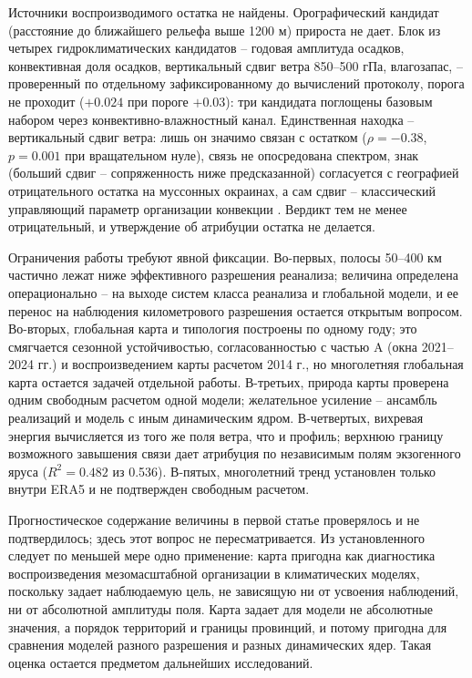 \documentclass[12pt,a4paper]{article}
\begin{document}
Источники воспроизводимого остатка не найдены. Орографический кандидат (расстояние до ближайшего рельефа выше 1200 м) прироста не дает. Блок из четырех гидроклиматических кандидатов -- годовая амплитуда осадков, конвективная доля осадков, вертикальный сдвиг ветра 850--500 гПа, влагозапас, -- проверенный по отдельному зафиксированному до вычислений протоколу, порога не проходит ($+0.024$ при пороге $+0.03$): три кандидата поглощены базовым набором через конвективно-влажностный канал. Единственная находка -- вертикальный сдвиг ветра: лишь он значимо связан с остатком ($\rho = -0.38$, $p = 0.001$ при вращательном нуле), связь не опосредована спектром, знак (больший сдвиг -- сопряженность ниже предсказанной) согласуется с географией отрицательного остатка на муссонных окраинах, а сам сдвиг -- классический управляющий параметр организации конвекции \cite{RotunnoKlempWeisman1988,Wing2017}. Вердикт тем не менее отрицательный, и утверждение об атрибуции остатка не делается.

Ограничения работы требуют явной фиксации. Во-первых, полосы 50--400 км частично лежат ниже эффективного разрешения реанализа; величина определена операционально -- на выходе систем класса реанализа и глобальной модели, и ее перенос на наблюдения километрового разрешения остается открытым вопросом. Во-вторых, глобальная карта и типология построены по одному году; это смягчается сезонной устойчивостью, согласованностью с частью A (окна 2021--2024 гг.) и воспроизведением карты расчетом 2014 г., но многолетняя глобальная карта остается задачей отдельной работы. В-третьих, природа карты проверена одним свободным расчетом одной модели; желательное усиление -- ансамбль реализаций и модель с иным динамическим ядром. В-четвертых, вихревая энергия вычисляется из того же поля ветра, что и профиль; верхнюю границу возможного завышения связи дает атрибуция по независимым полям экзогенного яруса ($R^2 = 0.482$ из 0.536). В-пятых, многолетний тренд установлен только внутри ERA5 и не подтвержден свободным расчетом.

Прогностическое содержание величины в первой статье проверялось и не подтвердилось; здесь этот вопрос не пересматривается. Из установленного следует по меньшей мере одно применение: карта пригодна как диагностика воспроизведения мезомасштабной организации в климатических моделях, поскольку задает наблюдаемую цель, не зависящую ни от усвоения наблюдений, ни от абсолютной амплитуды поля. Карта задает для модели не абсолютные значения, а порядок территорий и границы провинций, и потому пригодна для сравнения моделей разного разрешения и разных динамических ядер. Такая оценка остается предметом дальнейших исследований.
\end{document}
